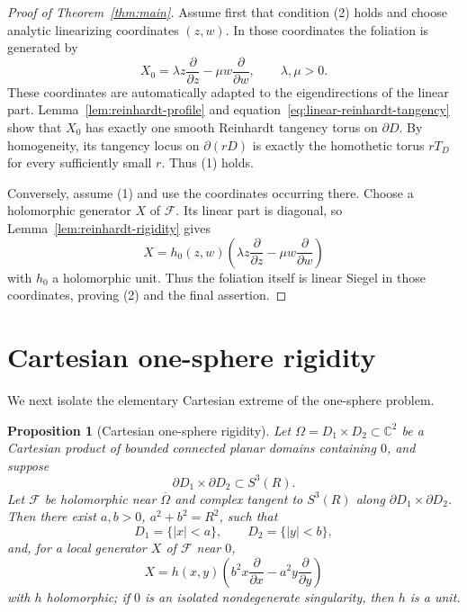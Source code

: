 \documentclass[11pt,reqno]{article}
\newtheorem{proposition}[theorem]{Proposition}
\theoremstyle{remark}
\newcommand{\C}{\mathbb C}
\newcommand{\F}{\mathcal F}
\newcommand{\Om}{\Omega}
\newcommand{\pd}{\partial}
\newcommand{\ol}{\overline}
\begin{document}
\begin{proof}[Proof of Theorem~\ref{thm:main}]
Assume first that condition \textup{(2)} holds and choose analytic linearizing coordinates $(z,w)$. In those coordinates the foliation is generated by
\[
 X_0=\lambda z\frac{\pd}{\pd z}-\mu w\frac{\pd}{\pd w},
 \qquad \lambda,\mu>0.
\]
These coordinates are automatically adapted to the eigendirections of the linear part. Lemma~\ref{lem:reinhardt-profile} and equation~\eqref{eq:linear-reinhardt-tangency} show that $X_0$ has exactly one smooth Reinhardt tangency torus on $\partial D$. By homogeneity, its tangency locus on $\partial(rD)$ is exactly the homothetic torus $rT_D$ for every sufficiently small $r$. Thus \textup{(1)} holds.

Conversely, assume \textup{(1)} and use the coordinates occurring there. Choose a holomorphic generator $X$ of $\F$. Its linear part is diagonal, so Lemma~\ref{lem:reinhardt-rigidity} gives
\[
 X=h_0(z,w)\left(
 \lambda z\frac{\pd}{\pd z}-\mu w\frac{\pd}{\pd w}
 \right)
\]
with $h_0$ a holomorphic unit. Thus the foliation itself is linear Siegel in those coordinates, proving \textup{(2)} and the final assertion.
\end{proof}

\section{Cartesian one-sphere rigidity}

We next isolate the elementary Cartesian extreme of the one-sphere problem.

\begin{proposition}[Cartesian one-sphere rigidity]\label{prop:cartesian}
Let $\Om=D_1\times D_2\subset\C^2$ be a Cartesian product of bounded connected planar domains containing $0$, and suppose
\[
 \partial D_1\times\partial D_2\subset S^3(R).
\]
Let $\F$ be holomorphic near $\ol\Om$ and complex tangent to $S^3(R)$ along $\partial D_1\times\partial D_2$. Then there exist $a,b>0$, $a^2+b^2=R^2$, such that
\[
 D_1=\{|x|<a\},\qquad D_2=\{|y|<b\},
\]
and, for a local generator $X$ of $\F$ near $0$,
\[
 X=h(x,y)\left(b^2x\frac{\pd}{\pd x}-a^2y\frac{\pd}{\pd y}\right)
\]
with $h$ holomorphic; if $0$ is an isolated nondegenerate singularity, then $h$ is a unit.
\end{proposition}
\end{document}
